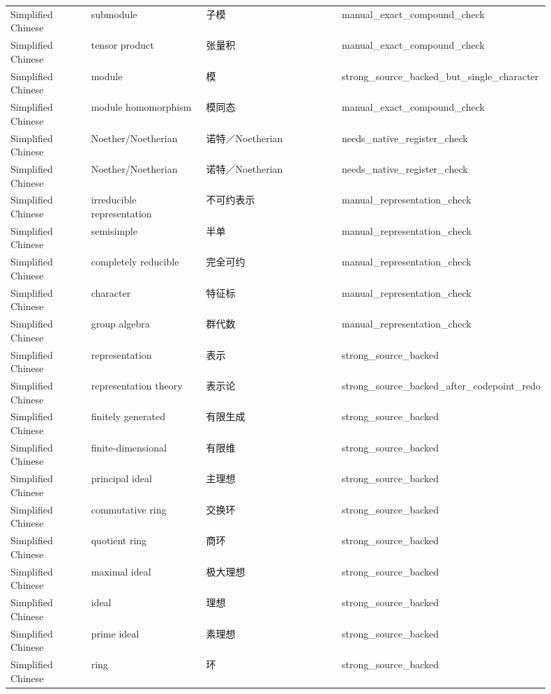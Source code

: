 \documentclass{article}
\begin{document}
\begin{longtable}{p{0.16\linewidth}p{0.22\linewidth}p{0.28\linewidth}p{0.24\linewidth}}
Simplified Chinese & submodule & 子模 & manual\_exact\_compound\_check \\
Simplified Chinese & tensor product & 张量积 & manual\_exact\_compound\_check \\
Simplified Chinese & module & 模 & strong\_source\_backed\_but\_single\_character \\
Simplified Chinese & module homomorphism & 模同态 & manual\_exact\_compound\_check \\
Simplified Chinese & Noether/Noetherian & 诺特／Noetherian & needs\_native\_register\_check \\
Simplified Chinese & Noether/Noetherian & 诺特／Noetherian & needs\_native\_register\_check \\
Simplified Chinese & irreducible representation & 不可约表示 & manual\_representation\_check \\
Simplified Chinese & semisimple & 半单 & manual\_representation\_check \\
Simplified Chinese & completely reducible & 完全可约 & manual\_representation\_check \\
Simplified Chinese & character & 特征标 & manual\_representation\_check \\
Simplified Chinese & group algebra & 群代数 & manual\_representation\_check \\
Simplified Chinese & representation & 表示 & strong\_source\_backed \\
Simplified Chinese & representation theory & 表示论 & strong\_source\_backed\_after\_codepoint\_redo \\
Simplified Chinese & finitely generated & 有限生成 & strong\_source\_backed \\
Simplified Chinese & finite-dimensional & 有限维 & strong\_source\_backed \\
Simplified Chinese & principal ideal & 主理想 & strong\_source\_backed \\
Simplified Chinese & commutative ring & 交换环 & strong\_source\_backed \\
Simplified Chinese & quotient ring & 商环 & strong\_source\_backed \\
Simplified Chinese & maximal ideal & 极大理想 & strong\_source\_backed \\
Simplified Chinese & ideal & 理想 & strong\_source\_backed \\
Simplified Chinese & prime ideal & 素理想 & strong\_source\_backed \\
Simplified Chinese & ring & 环 & strong\_source\_backed \\

\end{longtable}
\end{document}
